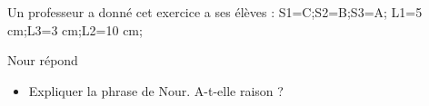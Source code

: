 \documentclass[exercice]{thedocument}%
\begin{document}
%
    Un professeur a donné cet exercice a ses élèves :
    \>S1=C;\>S2=B;\>S3=A;%
    \>L1=5 cm;\>L3=3 cm;\>L2=10 cm;%
    \begin{mdframed}
    \end{mdframed}
    Nour répond 
    \begin{itemize}
        \item Expliquer la phrase de Nour. A-t-elle raison ?
    \end{itemize}
\end{document}
